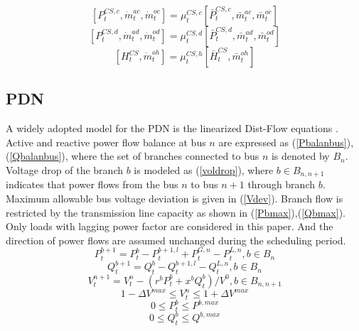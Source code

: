 \documentclass[journal,twoside,web]{ieeecolor}
\begin{document}
\begin{equation}\label{eq17}
     [P^{CS,c}_t,\dot m^{ac}_t,\dot m^{oc}_t]= \mu^{CS,c}_t [\bar P^{CS,c}_t,\bar m^{ac}_t,\bar m^{oc}_t]
\end{equation}
\begin{equation}\label{eq18}
	 [P^{CS,d}_t,\dot m^{ad}_t,\dot m^{od}_t]= \mu^{CS,d}_t [\bar P^{CS,d}_t,\bar m^{ad}_t,\bar m^{od}_t]
\end{equation}
\begin{equation}\label{eq19}
    [H^{CS}_t,\dot m^{oh}_t] = \mu^{CS,h}_t [\bar H^{CS}_t,\bar m^{oh}_t] 
\end{equation}




\subsection{PDN}
A widely adopted model for the PDN is the linearized Dist-Flow equations \cite{LinDistFlow}\cite{IETPDN}.
Active and reactive power flow balance at bus $n$ are expressed as (\ref{Pbalanbus}),(\ref{Qbalanbus}), where the set of branches connected to bus $n$ is denoted by $B_n$.
Voltage drop of the branch $b$ is modeled as (\ref{voldrop}), where $b\in B_{n,n+1}$ indicates that power flows from the bus $n$ to bus $n+1$ through branch $b$.
Maximum allowable bus voltage deviation is given in (\ref{Vdev}).
Branch flow is restricted by the transmission line capacity as shown in (\ref{Pbmax}),(\ref{Qbmax}).
Only loads with lagging power factor are considered in this paper.
And the direction of power flows are assumed unchanged during the scheduling period.
\begin{equation}\label{Pbalanbus}
    P^{b+1}_t = P^{b}_t - P^{b+1,l}_t + P^{G,n}_t - P^{L,n}_t, b\in B_n
\end{equation}
\begin{equation}\label{Qbalanbus}
    Q^{b+1}_t = Q^{b}_t - Q^{b+1,l}_t - Q^{L,n}_t, b\in B_n
\end{equation}
\begin{equation}\label{voldrop}
    V^{n+1}_t = V^{n}_t - (r^bP^b_t+x^bQ^b_t)/V^0, b\in B_{n,n+1}
\end{equation}
\begin{equation}\label{Vdev}
    1-\Delta V^{max}\le V^n_t \le 1 + \Delta V^{max}
\end{equation}
\begin{equation}\label{Pbmax}
    0\le P^b_t \le P^{b,max}
\end{equation}
\begin{equation}\label{Qbmax}
    0\le Q^b_t \le Q^{b,max}
\end{equation}
\end{document}
